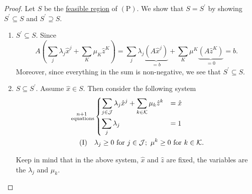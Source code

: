 \begin{proof}
	Let \(S\) be the \hyperref[def:feasible-region]{feasible region} of \((\mathrm{P})\). We show that \(S = S^\prime\) by showing \(S^\prime\subseteq S\) and \(S^\prime\supseteq S\).
	\begin{enumerate}
		\item \(S^\prime\subseteq S\). Since
		      \[
			      A\left(\sum\limits_{j}\lambda_{j}\hat{x}^j + \sum\limits_{K}\mu_K \hat{z}^K \right)= \sum\limits_j \lambda_{j}\underbrace{\left(A \hat{x}^j\right)}_{=b}+\sum\limits_{K} \mu^K \underbrace{\left(A \hat{z}^K\right)}_{=0} = b.
		      \]
		      Moreover, since everything in the sum is non-negative, we see that \(S^\prime\subseteq S\).
		\item \(S\subseteq S^\prime\). Assume \(\hat{x}\in S\). Then consider the following system
		      \[
			      \begin{split}
				      \substack{n+1\\ \text{ equations}}&\begin{dcases}
					      \sum\limits_{j\in\mathcal{J}} \lambda_{j}\hat{x}^j + \sum\limits_{k\in\mathcal{K} } \mu_k \hat{z}^k & = \hat{x} \\
					      \sum\limits_{j}\lambda_{j}                                                                          & = 1       \\
				      \end{dcases}\\
				      (\mathrm{I})\quad&\lambda_{j}\geq 0 \text{ for }j\in\mathcal{J};\ \mu^k\geq 0 \text{ for }k\in\mathcal{K}.
			      \end{split}
		      \]
		      \begin{note}
			      Keep in mind that in the above system, \(\hat{x}\) and \(\hat{z}\) are fixed, the variables are the \(\lambda_{j}\) and \(\mu_k\).
		      \end{note}


\end{enumerate}
\end{proof}

